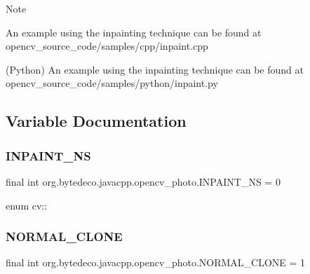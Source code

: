 \begin{DoxyNote}{Note}

\begin{DoxyItemize}
\item An example using the inpainting technique can be found at opencv\+\_\+source\+\_\+code/samples/cpp/inpaint.\+cpp
\begin{DoxyItemize}
\item (Python) An example using the inpainting technique can be found at opencv\+\_\+source\+\_\+code/samples/python/inpaint.\+py 
\end{DoxyItemize}
\end{DoxyItemize}
\end{DoxyNote}


\subsection{Variable Documentation}
\mbox{\label{group__photo_ga81c9fcd4663cdb43a1f8d9a782e57903}} 
\subsubsection{\texorpdfstring{I\+N\+P\+A\+I\+N\+T\+\_\+\+NS}{INPAINT\_NS}}
{\footnotesize\ttfamily final int org.\+bytedeco.\+javacpp.\+opencv\+\_\+photo.\+I\+N\+P\+A\+I\+N\+T\+\_\+\+NS = 0\hspace{0.3cm}{\ttfamily [static]}}

enum cv\+:\+: \mbox{\label{group__photo_ga4e82340ea44373f9457dac4bd64bbf85}} 
\subsubsection{\texorpdfstring{N\+O\+R\+M\+A\+L\+\_\+\+C\+L\+O\+NE}{NORMAL\_CLONE}}
{\footnotesize\ttfamily final int org.\+bytedeco.\+javacpp.\+opencv\+\_\+photo.\+N\+O\+R\+M\+A\+L\+\_\+\+C\+L\+O\+NE = 1\hspace{0.3cm}{\ttfamily [static]}}

